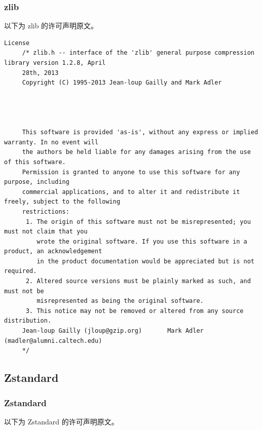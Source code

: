 \subsubsection*{zlib}

以下为 zlib 的许可声明原文。

\begin{lstlisting}[basicstyle=\ttfamily\footnotesize,breaklines=true]
     License
     /* zlib.h -- interface of the 'zlib' general purpose compression library version 1.2.8, April
     28th, 2013
     Copyright (C) 1995-2013 Jean-loup Gailly and Mark Adler




     This software is provided 'as-is', without any express or implied warranty. In no event will
     the authors be held liable for any damages arising from the use of this software.
     Permission is granted to anyone to use this software for any purpose, including
     commercial applications, and to alter it and redistribute it freely, subject to the following
     restrictions:
      1. The origin of this software must not be misrepresented; you must not claim that you
         wrote the original software. If you use this software in a product, an acknowledgement
         in the product documentation would be appreciated but is not required.
      2. Altered source versions must be plainly marked as such, and must not be
         misrepresented as being the original software.
      3. This notice may not be removed or altered from any source distribution.
     Jean-loup Gailly (jloup@gzip.org)       Mark Adler (madler@alumni.caltech.edu)
     */
\end{lstlisting}

\subsection{Zstandard}
\subsubsection*{Zstandard}

以下为 Zstandard 的许可声明原文。

